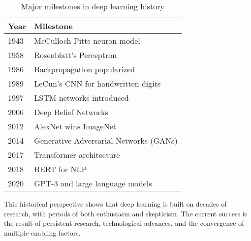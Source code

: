 \begin{table}[h]
\centering
\caption{Major milestones in deep learning history}
\label{tab:milestones}
\small
\begin{tabular}{@{}ll@{}}
\toprule
\textbf{Year} & \textbf{Milestone} \\
\midrule
1943 & McCulloch-Pitts neuron model \\
1958 & Rosenblatt's Perceptron \\
1986 & Backpropagation popularized \\
1989 & LeCun's CNN for handwritten digits \\
1997 & LSTM networks introduced \\
2006 & Deep Belief Networks \\
2012 & AlexNet wins ImageNet \\
2014 & Generative Adversarial Networks (GANs) \\
2017 & Transformer architecture \\
2018 & BERT for NLP \\
2020 & GPT-3 and large language models \\
\bottomrule
\end{tabular}
\end{table}

This historical perspective shows that deep learning is built on decades of research, with periods of both enthusiasm and skepticism. The current success is the result of persistent research, technological advances, and the convergence of multiple enabling factors.
